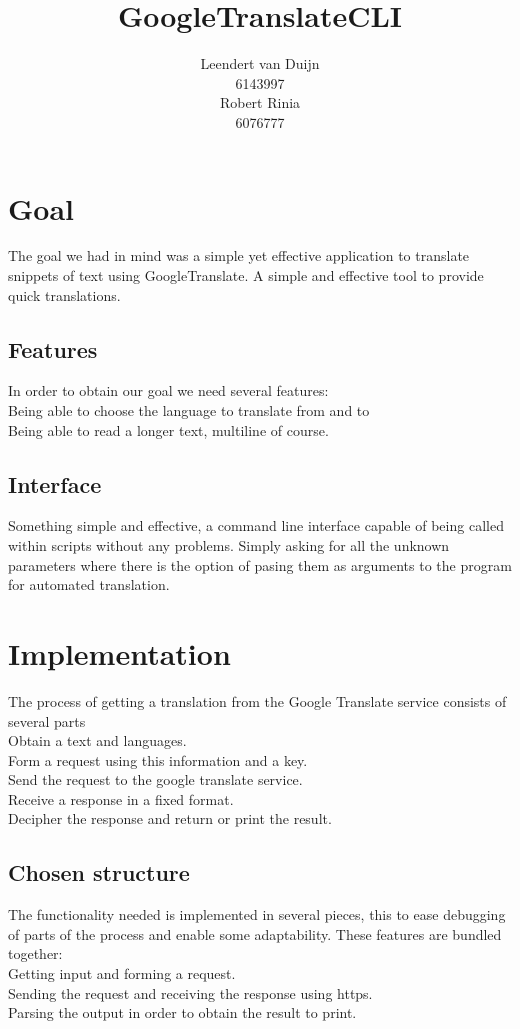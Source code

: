 \documentclass[a4paper]{article}
\author{Leendert van Duijn\\6143997\\Robert Rinia\\6076777}
\title{GoogleTranslateCLI}
\begin{document}
\maketitle
\tableofcontents
\newpage
\section{Goal}
The goal we had in mind was a simple yet effective application to translate
snippets of text using GoogleTranslate. A simple and effective tool to provide
quick translations.
\subsection{Features}
In order to obtain our goal we need several features:\\
Being able to choose the language to translate from and to\\
Being able to read a longer text, multiline of course.
\subsection{Interface}
Something simple and effective, a command line interface capable of being called
within scripts without any problems. Simply asking for all the unknown
parameters where there is the option of pasing them as arguments to the program
for automated translation.

\section{Implementation}
The process of getting a translation from the Google Translate service consists
of several parts\\
Obtain a text and languages.\\
Form a request using this information and a key.\\
Send the request to the google translate service.\\
Receive a response in a fixed format.\\
Decipher the response and return or print the result.\\
\newline
\subsection{Chosen structure}
The functionality needed is implemented in several pieces, this to ease
debugging of parts of the process and enable some adaptability. These features
are bundled together:\\
Getting input and forming a request.\\
Sending the request and receiving the response using https.\\
Parsing the output in order to obtain the result to print.\\
\end{document}
